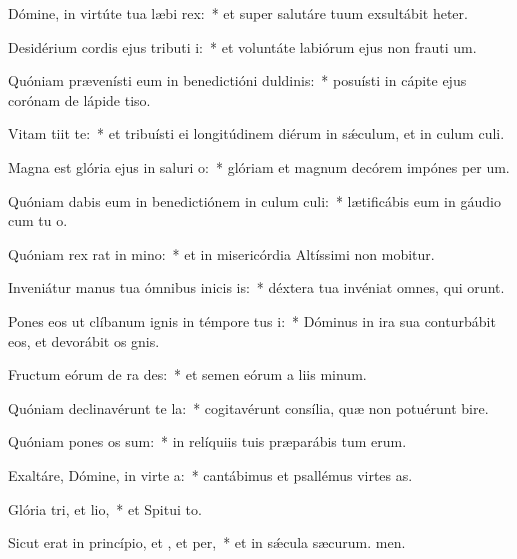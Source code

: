 \item Dómine, in virtúte tua læbi rex:~* et super salutáre tuum exsultábit heter.
\item Desidérium cordis ejus tributi i:~* et voluntáte labiórum ejus non frauti um.
\item Quóniam prævenísti eum in benedictióni duldinis:~* posuísti in cápite ejus corónam de lápide tiso.
\item Vitam tiit  te:~* et tribuísti ei longitúdinem diérum in sǽculum, et in culum culi.
\item Magna est glória ejus in saluri o:~* glóriam et magnum decórem impónes per um.
\item Quóniam dabis eum in benedictiónem in culum culi:~* lætificábis eum in gáudio cum tu o.
\item Quóniam rex rat in mino:~* et in misericórdia Altíssimi non mobitur.
\item Inveniátur manus tua ómnibus inicis is:~* déxtera tua invéniat omnes, qui  orunt.
\item Pones eos ut clíbanum ignis in témpore tus i:~* Dóminus in ira sua conturbábit eos, et devorábit os gnis.
\item Fructum eórum de ra des:~* et semen eórum a liis minum.
\item Quóniam declinavérunt  te la:~* cogitavérunt consília, quæ non potuérunt bire.
\item Quóniam pones os sum:~* in relíquiis tuis præparábis tum erum.
\item Exaltáre, Dómine, in virte a:~* cantábimus et psallémus virtes as.
\item Glória tri, et lio,~* et Spitui to.
\item Sicut erat in princípio, et , et per,~* et in sǽcula sæcurum. men.
